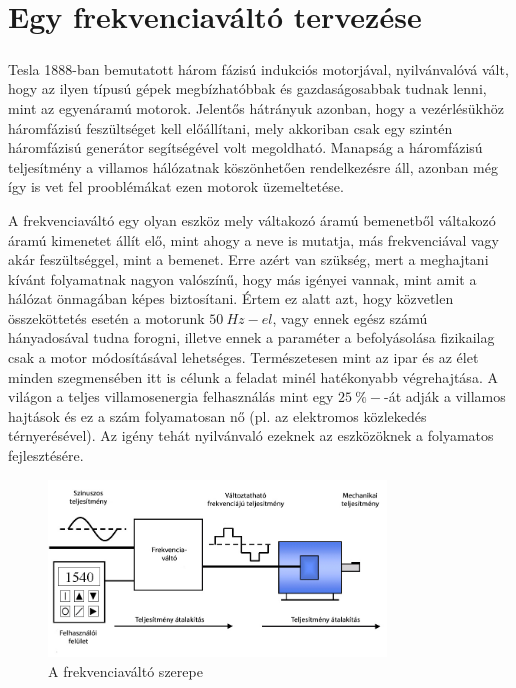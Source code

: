 \chapter{Egy frekvenciaváltó tervezése}

\paragraph{}

Tesla 1888-ban bemutatott három fázisú indukciós motorjával, nyilvánvalóvá vált, hogy az ilyen típusú gépek megbízhatóbbak és gazdaságosabbak tudnak lenni, mint az egyenáramú motorok. Jelentős hátrányuk azonban, hogy a vezérlésükhöz háromfázisú feszültséget kell előállítani, mely akkoriban csak egy szintén háromfázisú generátor segítségével volt megoldható. Manapság a háromfázisú teljesítmény a villamos hálózatnak köszönhetően rendelkezésre áll, azonban még így is vet fel prooblémákat ezen motorok üzemeltetése.

A frekvenciaváltó egy olyan eszköz mely váltakozó áramú bemenetből váltakozó áramú kimenetet állít elő, mint ahogy a neve is mutatja, más frekvenciával vagy akár feszültséggel, mint a bemenet. Erre azért van szükség, mert a meghajtani kívánt folyamatnak nagyon valószínű, hogy más igényei vannak, mint amit a hálózat önmagában képes biztosítani. Értem ez alatt azt, hogy közvetlen összeköttetés esetén a motorunk $50\ Hz-el$, vagy ennek egész számú hányadosával tudna forogni, illetve ennek a paraméter a befolyásolása fizikailag csak a motor módosításával lehetséges. Természetesen mint az ipar és az élet minden szegmensében itt is célunk a feladat minél hatékonyabb végrehajtása. A világon a teljes villamosenergia felhasználás mint egy $25\ \%-$-át adják a villamos hajtások és ez a szám folyamatosan nő (pl. az elektromos közlekedés térnyerésével). Az igény tehát nyilvánvaló ezeknek az eszközöknek a folyamatos fejlesztésére.

\begin{figure}[!h]
	\centering
	\includegraphics[width = 0.8\textwidth]{figures/VFD_System.jpg}
	\caption{A frekvenciaváltó szerepe} 
	\label{fig:vfd_system}
\end{figure}

